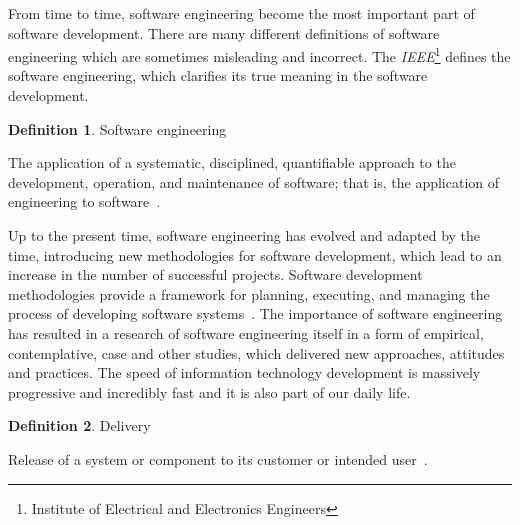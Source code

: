 \documentclass[12pt,a4paper]{article}
\theoremstyle{definition}
\newtheorem{definition}{Definition}[section]
\begin{document}
    From time to time, software engineering become the most important part of software development. There are many different definitions of software engineering which are sometimes misleading and incorrect. The \textit{IEEE}\footnote{Institute of Electrical and Electronics Engineers} defines the software engineering, which clarifies its true meaning in the software development.

    \begin{definition}
        Software engineering\\[-5mm]
        \begin{center}
            \begin{minipage}{0.9\textwidth}
                The application of a systematic, disciplined, quantifiable approach to the development, operation, and maintenance of software; that is, the application of engineering to software~\cite{182763}.\\[-2.5mm]
            \end{minipage}
        \end{center}
    \end{definition}

    Up to the present time, software engineering has evolved and adapted by the time, introducing new methodologies for software development, which lead to an increase in the number of successful projects. Software development methodologies provide a framework for planning, executing, and managing the process of developing software systems~\cite{7006383}. The importance of software engineering has resulted in a research of software engineering itself in a form of empirical, contemplative, case and other studies, which delivered new approaches, attitudes and practices. The speed of information technology development is massively progressive and incredibly fast and it is also part of our daily life.

    \begin{definition}
        Delivery\\[-5mm]
        \begin{center}
            \begin{minipage}{0.9\textwidth}
                Release of a system or component to its customer or intended user~\cite{182763}.\\[-2.5mm]
            \end{minipage}
        \end{center}
    \end{definition}
\end{document}
